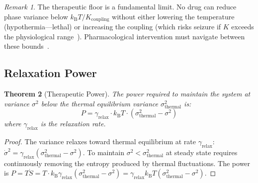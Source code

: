 \documentclass[10pt,twocolumn]{article}
\newtheorem{theorem}{Theorem}[section]
\theoremstyle{remark}
\newtheorem{remark}[theorem]{Remark}
\newcommand{\kB}{k_{\mathrm{B}}}
\begin{document}
\begin{remark}
The therapeutic floor is a fundamental limit. No drug can reduce phase variance below $\kB T / K_{\mathrm{coupling}}$ without either lowering the temperature (hypothermia---lethal) or increasing the coupling (which risks seizure if $K$ exceeds the physiological range~\cite{buzsaki2006rhythms}). Pharmacological intervention must navigate between these bounds~\cite{stahl2013psychopharmacology}.
\end{remark}

\subsection{Relaxation Power}

\begin{theorem}[Therapeutic Power]
\label{thm:power}
The power required to maintain the system at variance $\sigma^2$ below the thermal equilibrium variance $\sigma^2_{\mathrm{thermal}}$ is:
\begin{equation}
P = \gamma_{\mathrm{relax}} \cdot \kB T \cdot (\sigma^2_{\mathrm{thermal}} - \sigma^2)
\label{eq:power}
\end{equation}
where $\gamma_{\mathrm{relax}}$ is the relaxation rate.
\end{theorem}

\begin{proof}
The variance relaxes toward thermal equilibrium at rate $\gamma_{\mathrm{relax}}$: $\dot{\sigma}^2 = \gamma_{\mathrm{relax}}(\sigma^2_{\mathrm{thermal}} - \sigma^2)$. To maintain $\sigma^2 < \sigma^2_{\mathrm{thermal}}$ at steady state requires continuously removing the entropy produced by thermal fluctuations. The power is $P = T \dot{S} = T \cdot \kB \gamma_{\mathrm{relax}} (\sigma^2_{\mathrm{thermal}} - \sigma^2) = \gamma_{\mathrm{relax}} \kB T (\sigma^2_{\mathrm{thermal}} - \sigma^2)$.
\end{proof}
\end{document}
